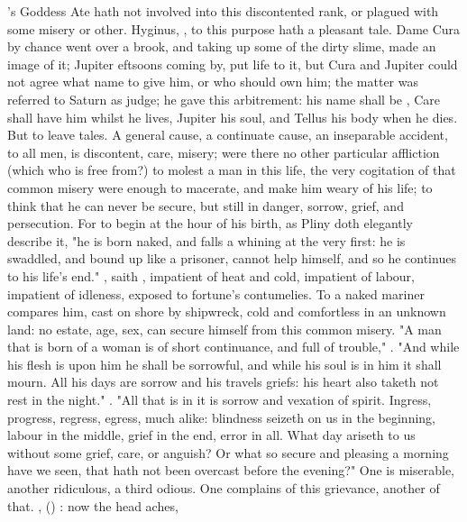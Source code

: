 \Homer{}'s Goddess Ate hath not involved into this discontented
rank, or plagued with some misery or other. Hyginus,
, to this purpose hath a pleasant tale. Dame
Cura by chance went over a brook, and taking up some of the dirty slime, made
an image of it; Jupiter eftsoons coming by, put life to it, but Cura and
Jupiter could not agree what name to give him, or who should own him; the
matter was referred to Saturn as judge; he gave this arbitrement: his name
shall be , Care shall have
him whilst he lives, Jupiter his soul, and Tellus his body when he dies. But to
leave tales. A general cause, a continuate cause, an inseparable accident, to
all men, is discontent, care, misery; were there no other particular affliction
(which who is free from?) to molest a man in this life, the very cogitation of
that common misery were enough to macerate, and make him weary of his life; to
think that he can never be secure, but still in danger, sorrow, grief, and
persecution. For to begin at the hour of his birth, as
Pliny doth elegantly describe it, "he is born naked, and
falls a whining at the very first: he is swaddled, and
bound up like a prisoner, cannot help himself, and so he continues to his
life's end." , saith \Seneca{},
impatient of heat and cold, impatient of labour, impatient of idleness, exposed
to fortune's contumelies. To a naked mariner \Lucretius{} compares him, cast on
shore by shipwreck, cold and comfortless in an unknown land:
no estate, age, sex, can secure himself from this common
misery. "A man that is born of a woman is of short continuance, and full of
trouble," . "And while his flesh is upon him he
shall be sorrowful, and while his soul is in him it shall mourn. All his days
are sorrow and his travels griefs: his heart also taketh not rest in the
night." . "All that is in it is
sorrow and vexation of spirit. Ingress, progress, regress,
egress, much alike: blindness seizeth on us in the beginning, labour in the
middle, grief in the end, error in all. What day ariseth to us without some
grief, care, or anguish? Or what so secure and pleasing a morning have we seen,
that hath not been overcast before the evening?" One is miserable, another
ridiculous, a third odious. One complains of this grievance, another of that.
, (\Seneca{}) : now the head aches,
